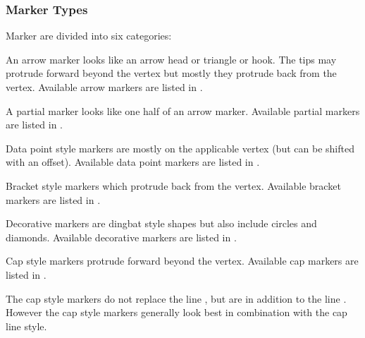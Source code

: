 \subsubsection{Marker Types}\label{sec:markertypes}

Marker 
are divided into six categories:


An arrow marker looks like an arrow head or triangle or hook.
The tips may protrude forward beyond the vertex but mostly they protrude
back from the vertex.
Available arrow markers are listed in .


A partial marker looks like one half of an arrow marker.
Available partial markers are listed in .


Data point style markers are mostly  on the applicable
vertex (but can be shifted with an offset).
Available data point markers are listed in .


Bracket style markers which protrude back from the vertex.
Available bracket markers are listed in .


Decorative markers are dingbat style shapes but also include circles
and diamonds.
Available decorative markers are listed in .

Cap style markers protrude forward beyond the vertex.
Available cap markers are listed in .

\begin{important}
The cap style markers do not replace the line ,
but are in addition to the line . However the cap style
markers generally look best in combination with the
 cap line style.
\end{important}

